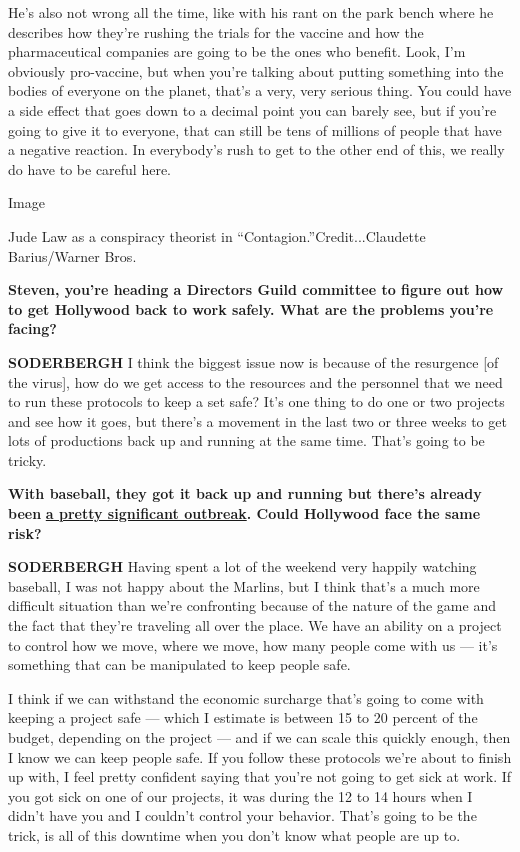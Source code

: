 He's also not wrong all the time, like with his rant on the park bench
where he describes how they're rushing the trials for the vaccine and
how the pharmaceutical companies are going to be the ones who benefit.
Look, I'm obviously pro-vaccine, but when you're talking about putting
something into the bodies of everyone on the planet, that's a very, very
serious thing. You could have a side effect that goes down to a decimal
point you can barely see, but if you're going to give it to everyone,
that can still be tens of millions of people that have a negative
reaction. In everybody's rush to get to the other end of this, we really
do have to be careful here.

Image

Jude Law as a conspiracy theorist in ``Contagion.''Credit...Claudette
Barius/Warner Bros.

\textbf{Steven, you're heading a Directors Guild committee to figure out
how to get Hollywood back to work safely. What are the problems you're
facing?}

\textbf{SODERBERGH} I think the biggest issue now is because of the
resurgence {[}of the virus{]}, how do we get access to the resources and
the personnel that we need to run these protocols to keep a set safe?
It's one thing to do one or two projects and see how it goes, but
there's a movement in the last two or three weeks to get lots of
productions back up and running at the same time. That's going to be
tricky.

\textbf{With baseball, they got it back up and running but there's
already been}
\textbf{\href{https://www.nytimes.com/2020/07/27/sports/baseball/marlins-game-canceled.html}{a
pretty significant outbreak}. Could Hollywood face the same risk?}

\textbf{SODERBERGH} Having spent a lot of the weekend very happily
watching baseball, I was not happy about the Marlins, but I think that's
a much more difficult situation than we're confronting because of the
nature of the game and the fact that they're traveling all over the
place. We have an ability on a project to control how we move, where we
move, how many people come with us --- it's something that can be
manipulated to keep people safe.

I think if we can withstand the economic surcharge that's going to come
with keeping a project safe --- which I estimate is between 15 to 20
percent of the budget, depending on the project --- and if we can scale
this quickly enough, then I know we can keep people safe. If you follow
these protocols we're about to finish up with, I feel pretty confident
saying that you're not going to get sick at work. If you got sick on one
of our projects, it was during the 12 to 14 hours when I didn't have you
and I couldn't control your behavior. That's going to be the trick, is
all of this downtime when you don't know what people are up to.

